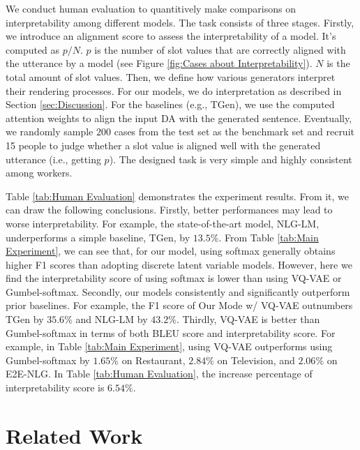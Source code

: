 \documentclass[letterpaper]{article} %
\begin{document}
	We conduct human evaluation to quantitively make comparisons on interpretability among different models. The task consists of three stages. Firstly, we introduce an alignment score to assess the interpretability of a model. It's computed as $p / N$. $p$ is the number of slot values that are correctly aligned with the utterance by a model (see Figure \ref{fig:Cases about Interpretability}). $N$ is the total amount of slot values. Then, we define how various generators interpret their rendering processes. For our models, we do interpretation as described in Section \ref{sec:Discussion}. For the baselines (e.g., TGen), we use the computed attention weights to align the input DA with the generated sentence. Eventually, we randomly sample $200$ cases from the test set as the benchmark set and recruit 15 people to judge whether a slot value is aligned well with the generated utterance (i.e., getting $p$). The designed task is very simple and highly consistent among workers.
	
	Table \ref{tab:Human Evaluation} demonstrates the experiment results. From it, we can draw the following conclusions. Firstly, better performances may lead to worse interpretability. For example, the state-of-the-art model, NLG-LM, underperforms a simple baseline, TGen, by $13.5\%$. From Table \ref{tab:Main Experiment}, we can see that, for our model, using softmax generally obtains higher F1 scores than adopting discrete latent variable models. However, here we find the interpretability score of using softmax is lower than using VQ-VAE or Gumbel-softmax. Secondly, our models consistently and significantly outperform prior baselines. For example, the F1 score of Our Mode w/ VQ-VAE outnumbers TGen by $35.6\%$ and NLG-LM by $43.2\%$. Thirdly, VQ-VAE is better than Gumbel-softmax in terms of both BLEU score and interpretability score. For example, in Table \ref{tab:Main Experiment}, using VQ-VAE outperforms using Gumbel-softmax by $1.65\%$ on Restaurant, $2.84\%$ on Television, and $2.06\%$ on E2E-NLG. In Table \ref{tab:Human Evaluation}, the increase percentage of interpretability score is $6.54\%$.

\section{Related Work}
	
\end{document}
